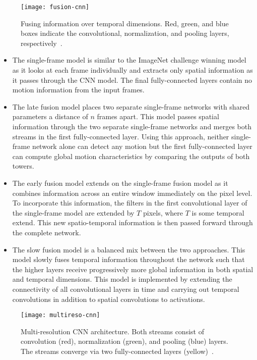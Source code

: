 \begin{figure}
  \centering
    \texttt{[image: fusion-cnn]}
    \caption{Fusing information over temporal dimensions. Red, green, and blue boxes indicate the convolutional, normalization, and pooling layers, respectively~\cite{LargeScaleFusionCNN:2014}.}
    \label{fig:fusion-cnn}
\end{figure}

\begin{itemize}
  \item The single-frame model is similar to the ImageNet challenge winning model~\cite{Krizhevsky:2012} as it looks at each frame individually and extracts only spatial information as it passes through the CNN model. The final fully-connected layers contain no motion information from the input frames.
  \item The late fusion model places two separate single-frame networks with shared parameters a distance of $n$ frames apart. This model passes spatial information through the two separate single-frame networks and merges both streams in the first fully-connected layer. Using this approach, neither single-frame network alone can detect any motion but the first fully-connected layer can compute global motion characteristics by comparing the outputs of both towers.
  \item The early fusion model extends on the single-frame fusion model as it combines information across an entire window immediately on the pixel level. To incorporate this information, the filters in the first convolutional layer of the single-frame model are extended by $T$ pixels, where $T$ is some temporal extend. This new spatio-temporal information is then passed forward through the complete network. 
  \item The slow fusion model is a balanced mix between the two approaches. This model slowly fuses temporal information throughout the network such that the higher layers receive progressively more global information in both spatial and temporal dimensions. This model is implemented by extending the connectivity of all convolutional layers in time and carrying out temporal convolutions in addition to spatial convolutions to activations.
\end{itemize}

\begin{figure}
  \centering
    \texttt{[image: multireso-cnn]}
    \caption{Multi-resolution CNN architecture. Both streams consist of convolution (red), normalization (green), and pooling (blue) layers. The streams converge via two fully-connected layers (yellow)~\cite{LargeScaleFusionCNN:2014}.}
    \label{fig:multireso-cnn}
\end{figure}

